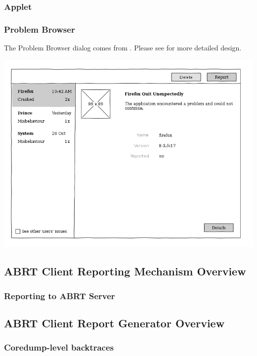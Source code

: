\documentclass{article}
\begin{document}
\subsubsection{Applet}

\cleardoublepage
\subsubsection{Problem Browser}
The Problem Browser dialog comes from \cite{JonOops}. Please see
\cite{JonOops} for more detailed design.

\begin{center}
\includegraphics[width=\textwidth]{client-ui-issue-browser.png}
\end{center}

\subsection{ABRT Client Reporting Mechanism Overview}

\subsubsection{Reporting to ABRT Server}

\subsection{ABRT Client Report Generator Overview}

\subsubsection{Coredump-level backtraces}
\end{document}
